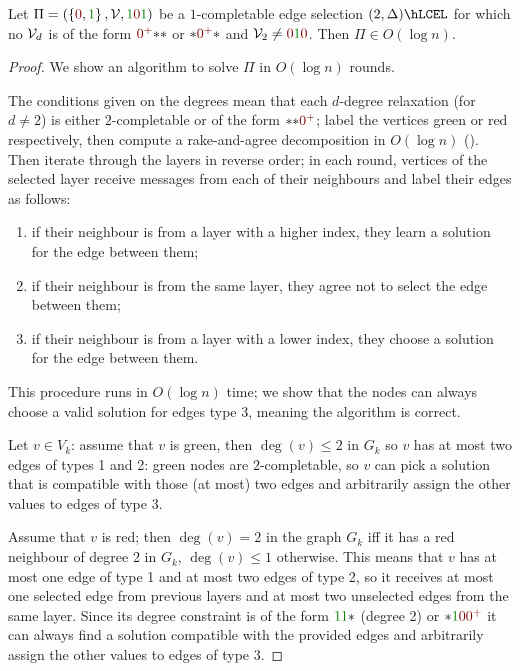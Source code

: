 \documentclass[12pt,a4paper]{article}
\begin{document}
\begin{lem}\label{lem:es-trim}
    Let $\Pi=(\Set{\n,\y},\Vc,\y\n\y)$ be a $1$-completable edge selection $(2,\Delta)\hLCEL$ for which no $\mathcal{V}_d$ is of the form $\npl\x\x$ or $\x\npl\x$ and $\Vc_2\neq\n\y\n$. Then $\Pi\in O(\log n)$.
\end{lem}
\begin{proof}
    We show an algorithm to solve $\Pi$ in $O(\log n)$ rounds.
    
    The conditions given on the degrees mean that each $d$-degree relaxation (for $d\neq 2$) is either $2$-completable or of the form $\x\x\npl$; label the vertices green or red respectively, then compute a rake-and-agree decomposition in $O(\log n)$ (). Then iterate through the layers in reverse order; in each round, vertices of the selected layer receive messages from each of their neighbours and label their edges as follows:
    \begin{enumerate}
        \item if their neighbour is from a layer with a higher index, they learn a solution for the edge between them; 
        \item if their neighbour is from the same layer, they agree not to select the edge between them;
        \item if their neighbour is from a layer with a lower index, they choose a solution for the edge between them.
    \end{enumerate}
    This procedure runs in $O(\log n)$ time; we show that the nodes can always choose a valid solution for edges type 3, meaning the algorithm is correct.
    
    Let $v\in V_k$: assume that $v$ is green, then $\deg(v)\leq 2$ in $G_k$ so $v$ has at most two edges of types 1 and 2: green nodes are $2$-completable, so $v$ can pick a solution that is compatible with those (at most) two edges and arbitrarily assign the other values to edges of type 3.

    Assume that $v$ is red; then $\deg(v)=2$ in the graph $G_k$ iff it has a red neighbour of degree 2 in $G_k$, $\deg(v)\leq 1$ otherwise. This means that $v$ has at most one edge of type 1 and at most two edges of type 2, so it receives at most one selected edge from previous layers and at most two unselected edges from the same layer. Since its degree constraint is of the form $\y\y\x$ (degree 2) or $\x\y\n\npl$ it can always find a solution compatible with the provided edges and arbitrarily assign the other values to edges of type 3.
\end{proof}
\end{document}
